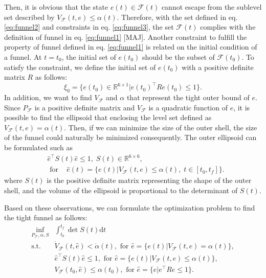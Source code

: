 \documentclass[letterpaper, 10 pt, conference]{ieeeconf}  %
\begin{document}
Then, it is obvious that the state $e(t) \in \mathcal{F}(t)$ cannot escape from the sublevel set described by $V_\mathcal{F}(t,e) \leq \alpha(t)$.
Therefore, with the set defined in eq. \eqref{eq:funnel2} and constraints in eq. \eqref{eq:funnel3}, 
the set $\mathcal{F}(t)$ complies with the definition of funnel in eq. \eqref{eq:funnel1} [MAJ]. 
Another constraint to fulfill the property of funnel defined in eq. \eqref{eq:funnel1} is related on the initial condition of a funnel. 
At $t = t_0$, the initial set of $e(t_0)$ should be the subset of $\mathcal{F}(t_0)$. 
To satisfy the constraint, we define the initial set of $e(t_0)$ with a positive definite matrix $R$ as follows:
\begin{equation}
\xi_0 = \{e(t_0) \in \mathbb{R}^{6\times1}|e(t_0)^\intercal R e(t_0) \leq 1\}.
\end{equation} 
In addition, we want to find $V_\mathcal{F}$ and $\alpha$ that represent the tight outer bound of $e$. 
Since $P_\mathcal{F}$ is a positive definite matrix and $V_\mathcal{F}$ is a quadratic function of $e$, 
it is possible to find the ellipsoid that enclosing the level set defined as $V_\mathcal{F}(t,e) = \alpha(t)$.
Then, if we can minimize the size of the outer shell, the size of the funnel could naturally be minimized consequently.
The outer ellipsoid can be formulated such as
\begin{align}
&\hat{e}^\intercal S(t) \hat{e} \leq 1,\;S(t) \in \mathbb{R}^{6\times 6}, \nonumber \\
&\text{ for }\;\;\;\hat{e}(t) = \{e(t)|V_\mathcal{F}(t,e) \leq \alpha(t),\;t \in [t_0,t_f]\}. \nonumber
\end{align}
where $S(t)$ is the positive definite matrix representing the shape of the outer shell, and the volume of the ellipsoid is proportional to the determinant of $S(t)$.

Based on these observations, we can formulate the optimization problem to find the tight funnel as follows:
\begin{equation}
\begin{array}{rl}
\displaystyle{\inf_{P_\mathcal{F},\alpha,S}} & \int_{t_0}^{t_f} \det{S(t)}\text{d}t \nonumber \\
\displaystyle{\text{s.t.}}& \dot{V}_\mathcal{F}(t,\hat{e}) < \dot{\alpha}(t),\text{ for }\hat{e} = \{e(t)|V_\mathcal{F}(t,e) = \alpha(t)\}, \nonumber \\
& \hat{e}^\intercal S(t) \hat{e} \leq 1,\text{ for }\hat{e} = \{e(t)|V_\mathcal{F}(t,e) \leq \alpha(t)\}, \nonumber \\
& V_\mathcal{F}(t_0,\hat{e}) \leq \alpha(t_0),\text{ for }\hat{e} = \{e|e^\intercal R e \leq 1\}. \nonumber
\end{array}
\end{equation}
\end{document}
